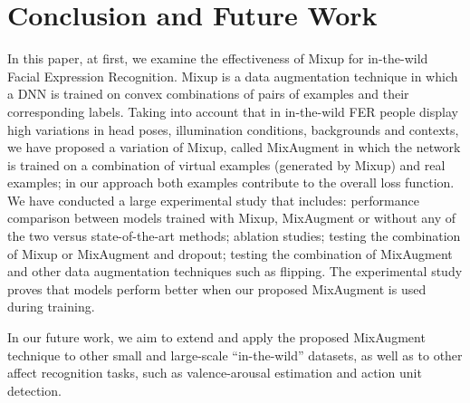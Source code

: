 \documentclass[10pt,twocolumn,letterpaper]{article}
\begin{document}
\section{Conclusion and Future Work}

In this paper, at first, we examine the effectiveness of
Mixup for in-the-wild Facial Expression Recognition. Mixup is a data augmentation technique in which a DNN is trained on convex
combinations of pairs of examples and their corresponding labels. Taking into account that in in-the-wild FER people display high variations in head poses, illumination conditions, backgrounds and contexts, we have proposed a variation of Mixup, called MixAugment in which the network is trained on a combination of virtual examples (generated by Mixup) and real examples; in our approach both examples contribute to the overall loss function. 
We have conducted a large experimental study that includes: performance comparison between models trained with Mixup, MixAugment or without any of the two versus state-of-the-art methods; ablation studies; testing the combination of Mixup or MixAugment and dropout; testing the combination of MixAugment and other data augmentation techniques such as flipping. The experimental study proves that models perform better when our proposed MixAugment is used during training.



In our future work, we aim to extend and apply the proposed MixAugment technique to other small and large-scale \enquote{in-the-wild} datasets, as well as to other affect recognition tasks, such as valence-arousal estimation and action unit detection. 




{\small


}
\end{document}

